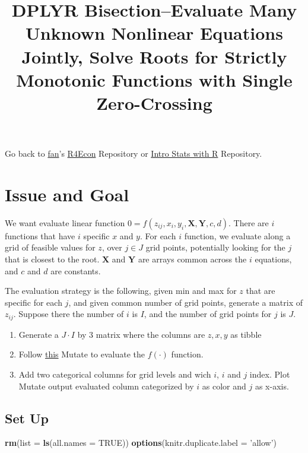 \documentclass[]{article}
\title{DPLYR Bisection--Evaluate Many Unknown Nonlinear Equations Jointly,
Solve Roots for Strictly Monotonic Functions with Single Zero-Crossing}
\author{}
\date{\vspace{-2.5em}}
\newenvironment{Shaded}{\begin{snugshade}}{\end{snugshade}}
\newcommand{\DataTypeTok}[1]{\textcolor[rgb]{0.13,0.29,0.53}{#1}}
\newcommand{\KeywordTok}[1]{\textcolor[rgb]{0.13,0.29,0.53}{\textbf{#1}}}
\newcommand{\NormalTok}[1]{#1}
\newcommand{\OtherTok}[1]{\textcolor[rgb]{0.56,0.35,0.01}{#1}}
\newcommand{\StringTok}[1]{\textcolor[rgb]{0.31,0.60,0.02}{#1}}
\providecommand{\tightlist}{%
  \setlength{\itemsep}{0pt}\setlength{\parskip}{0pt}}
\begin{document}
\maketitle

Go back to \href{http://fanwangecon.github.io/CodeDynaAsset/}{fan}'s
\href{https://fanwangecon.github.io/R4Econ/}{R4Econ} Repository or
\href{https://fanwangecon.github.io/Stat4Econ/}{Intro Stats with R}
Repository.

\hypertarget{issue-and-goal}{%
\section{Issue and Goal}\label{issue-and-goal}}

We want evaluate linear function
\(0=f(z_{ij}, x_i, y_i, \textbf{X}, \textbf{Y}, c, d)\). There are \(i\)
functions that have \(i\) specific \(x\) and \(y\). For each \(i\)
function, we evaluate along a grid of feasible values for \(z\), over
\(j\in J\) grid points, potentially looking for the \(j\) that is
closest to the root. \(\textbf{X}\) and \(\textbf{Y}\) are arrays common
across the \(i\) equations, and \(c\) and \(d\) are constants.

The evaluation strategy is the following, given min and max for \(z\)
that are specific for each \(j\), and given common number of grid
points, generate a matrix of \(z_{ij}\). Suppose there the number of
\(i\) is \(I\), and the number of grid points for \(j\) is \(J\).

\begin{enumerate}
\def\labelenumi{\arabic{enumi}.}
\tightlist
\item
  Generate a \(J \cdot I\) by \(3\) matrix where the columns are
  \(z,x,y\) as tibble
\item
  Follow
  \href{https://fanwangecon.github.io/R4Econ/support/function/fs_funceval.html}{this}
  Mutate to evaluate the \(f(\cdot)\) function.
\item
  Add two categorical columns for grid levels and wich \(i\), \(i\) and
  \(j\) index. Plot Mutate output evaluated column categorized by \(i\)
  as color and \(j\) as x-axis.
\end{enumerate}

\hypertarget{set-up}{%
\subsection{Set Up}\label{set-up}}

\begin{Shaded}
\begin{Highlighting}[]
\KeywordTok{rm}\NormalTok{(}\DataTypeTok{list =} \KeywordTok{ls}\NormalTok{(}\DataTypeTok{all.names =} \OtherTok{TRUE}\NormalTok{))}
\KeywordTok{options}\NormalTok{(}\DataTypeTok{knitr.duplicate.label =} \StringTok{'allow'}\NormalTok{)}
\end{Highlighting}
\end{Shaded}
\end{document}

